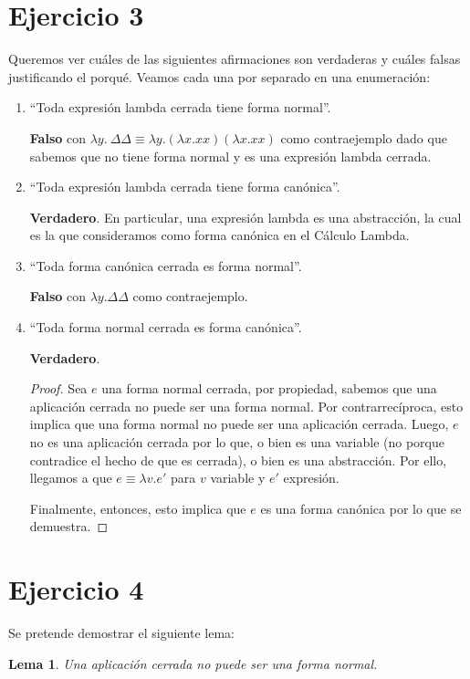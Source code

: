 \documentclass{article}
\newtheorem*{lemma*}{Lema}
\begin{document}
\section*{Ejercicio 3}
Queremos ver cuáles de las siguientes afirmaciones son verdaderas y cuáles falsas justificando el porqué.
Veamos cada una por separado en una enumeración:
\begin{enumerate}[label=(\alph*)]
  \item ``Toda expresión lambda cerrada tiene forma normal''.

    \textbf{Falso} con $\lambda y.\ \Delta\Delta \equiv \lambda y. (\lambda x. xx)(\lambda x. xx)$ como contraejemplo dado que sabemos que no tiene forma normal y es una expresión lambda cerrada.

  \item ``Toda expresión lambda cerrada tiene forma canónica''.

    \textbf{Verdadero}. En particular, una expresión lambda es una abstracción, la cual es la que consideramos como forma canónica en el Cálculo Lambda.

  \item ``Toda forma canónica cerrada es forma normal''.

    \textbf{Falso} con $\lambda y. \Delta\Delta$ como contraejemplo.

  \item ``Toda forma normal cerrada es forma canónica''.

    \textbf{Verdadero}.
    \begin{proof}
      Sea $e$ una forma normal cerrada, por propiedad, sabemos que una aplicación cerrada no puede ser una forma normal.
      Por contrarrecíproca, esto implica que una forma normal no puede ser una aplicación cerrada.
      Luego, $e$ no es una aplicación cerrada por lo que, o bien es una variable (no porque contradice el hecho de que es cerrada), o bien es una abstracción.
      Por ello, llegamos a que $e \equiv \lambda v. e'$ para $v$ variable y $e'$ expresión.

      Finalmente, entonces, esto implica que $e$ es una forma canónica por lo que se demuestra.
    \end{proof}
\end{enumerate}

\section*{Ejercicio 4}
Se pretende demostrar el siguiente lema:
\begin{lemma*}
  Una aplicación cerrada no puede ser una forma normal.
\end{lemma*}
\end{document}
